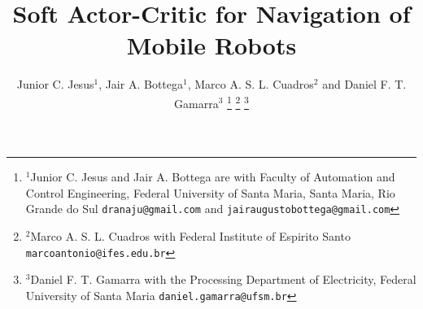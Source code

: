\title{\LARGE \bf
Soft Actor-Critic for Navigation of Mobile Robots
}


\author{Junior C. Jesus$^{1}$, Jair A. Bottega$^{1}$, Marco A. S. L. Cuadros$^{2}$ and Daniel F. T. Gamarra$^{3}$%
\thanks{$^{1}$Junior C. Jesus and Jair A. Bottega are with Faculty of Automation and Control Engineering,
        Federal University of Santa Maria, Santa Maria, Rio Grande do Sul
        {\tt\small dranaju@gmail.com} and {\tt\small jairaugustobottega@gmail.com}}%
\thanks{$^{2}$Marco A. S. L. Cuadros with Federal Institute of Espirito Santo
        {\tt\small marcoantonio@ifes.edu.br}}%
\thanks{$^{3}$Daniel F. T. Gamarra with the Processing 
Department of Electricity, Federal University of Santa Maria
        {\tt\small daniel.gamarra@ufsm.br}}%
}